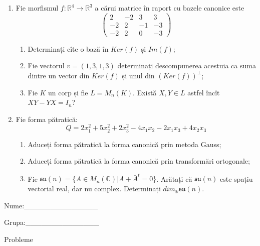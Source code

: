 \documentclass{article}
\begin{document}
\begin{enumerate}
 \item Fie morfismul $f:\mathbb{R}^4 \to \mathbb{R}^3$ a cărui matrice în raport cu bazele canonice este
$$\begin{pmatrix}
2&-2&3&3\\
-2&2&-1&-3\\
-2&2&0&-3
\end{pmatrix}$$

\begin{enumerate}
\item Determinați cîte o bază în $Ker(f)$ și $Im(f)$;
\item Fie vectorul $v=(1,3,1,3)$ determinați descompunerea acestuia ca suma dintre un vector din $Ker(f)$ și unul din $(Ker(f))^\perp$;
\item Fie $K$ un corp și fie $L=M_n(K)$. Există $X,Y \in L$ astfel încît $XY-YX=I_n$?  
\end{enumerate}
\item Fie forma pătratică:
$$Q= 2x_1^2+5x_2^2+2x_3^2-4x_1x_2-2x_1x_3+4x_2x_3$$

\begin{enumerate}
\item Aduceți forma pătratică la forma canonică prin metoda Gauss;
\item Aduceți forma pătratică la forma canonică prin transformări ortogonale;
\item Fie $\mathfrak{su}(n)=\{ A \in M_n(\mathbb{C}) | A+\bar{A}^t=0\}$. Arătați că $\mathfrak{su}(n)$ este spațiu vectorial real, dar nu complex.
Determinați $dim_{\mathbb{R}}\mathfrak{su}(n)$.
\end{enumerate}
\end{enumerate}
\newpage
\begin{flushright}
Nume:\_\_\_\_\_\_\_\_\_\_\_\_\_\_
 
 
Grupa:\_\_\_\_\_\_\_\_\_\_\_\_\_\_
\end{flushright}
\begin{center}
\vspace{2cm}
{\Large Probleme}
\vspace{2cm}
\end{center}
\end{document}
